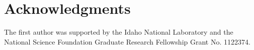 \section*{A\lowercase{cknowledgments}}

The first author was supported by the Idaho National Laboratory and the National Science Foundation Graduate Research Fellowship Grant No. 1122374.
